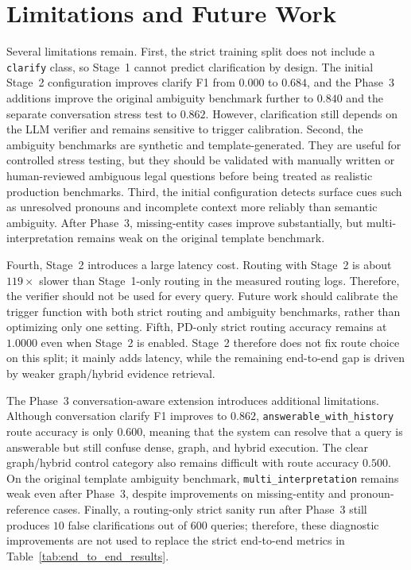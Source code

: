\documentclass[11pt,twocolumn]{article}
\begin{document}
\section{Limitations and Future Work}
\label{sec:limitations}

Several limitations remain. First, the strict training split
does not include a \texttt{clarify} class, so Stage~1 cannot
predict clarification by design. The initial Stage~2
configuration improves clarify F1 from $0.000$ to $0.684$,
and the Phase~3 additions improve the original ambiguity
benchmark further to $0.840$ and the separate conversation
stress test to $0.862$. However, clarification still depends
on the LLM verifier and remains sensitive to trigger
calibration. Second, the ambiguity benchmarks are synthetic
and template-generated. They are useful for controlled stress
testing, but they should be validated with manually written or
human-reviewed ambiguous legal questions before being treated
as realistic production benchmarks. Third, the initial
configuration detects surface cues such as unresolved pronouns
and incomplete context more reliably than semantic ambiguity.
After Phase~3, missing-entity cases improve substantially, but
multi-interpretation remains weak on the original template
benchmark.

Fourth, Stage~2 introduces a large latency cost. Routing with
Stage~2 is about $119\times$ slower than Stage~1-only routing
in the measured routing logs. Therefore, the verifier should
not be used for every query. Future work should calibrate the
trigger function with both strict routing and ambiguity
benchmarks, rather than optimizing only one setting. Fifth,
PD-only strict routing accuracy remains at $1.0000$ even when Stage~2
is enabled. Stage~2 therefore does not fix route choice on this split;
it mainly adds latency, while the remaining end-to-end gap is driven by
weaker graph/hybrid evidence retrieval.

The Phase~3 conversation-aware extension introduces additional
limitations. Although conversation clarify F1 improves to
$0.862$, \texttt{answerable\_with\_history} route accuracy is
only $0.600$, meaning that the system can resolve that a query
is answerable but still confuse dense, graph, and hybrid
execution. The clear graph/hybrid control category also
remains difficult with route accuracy $0.500$. On the original
template ambiguity benchmark, \texttt{multi\_interpretation}
remains weak even after Phase~3, despite improvements on
missing-entity and pronoun-reference cases. Finally, a
routing-only strict sanity run after Phase~3 still produces
$10$ false clarifications out of $600$ queries; therefore,
these diagnostic improvements are not used to replace the
strict end-to-end metrics in Table~\ref{tab:end_to_end_results}.
\end{document}
